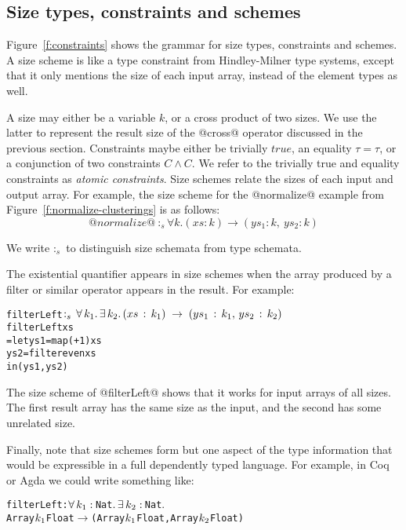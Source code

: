\newcommand{\constr}[1]{\llbracket #1 \rrbracket}


\subsection{Size types, constraints and schemes}
\label{s:SizeTypes}
Figure~\ref{f:constraints} shows the grammar for size types, constraints and schemes. A size scheme is like a type constraint from Hindley-Milner type systems, except that it only mentions the size of each input array, instead of the element types as well.

A size may either be a variable $k$, or a cross product of two sizes. We use the latter to represent the result size of the @cross@ operator discussed in the previous section. Constraints maybe either be trivially $true$, an equality $\tau = \tau$, or a conjunction of two constraints $C \wedge C$. We refer to the trivially true and equality constraints as \emph{atomic constraints}. Size schemes relate the sizes of each input and output array. For example, the size scheme for the @normalize@ example from Figure~\ref{f:normalize-clusterings} is as follows:
$$@normalize@ ~:_s \forall k. (xs : k) \to (ys_1 : k,~ ys_2 : k)
$$

We write $:_s$ to distinguish size schemata from type schemata.

The existential quantifier appears in size schemes when the array produced by a filter or similar operator appears in the result. For example:
\begin{alltt}
   filterLeft \(:\sb{s}\,\forall\,k\sb{1}.\,\exists\,k\sb{2}.\,(xs\,:\,k\sb{1})\;\to\;(ys\sb{1}\,:\,k\sb{1},\,ys\sb{2}\,:\,k\sb{2})\)
   filterLeft xs
     = let ys1 = map (+ 1)   xs
           ys2 = filter even xs
       in (ys1, ys2)
\end{alltt}

The size scheme of @filterLeft@ shows that it works for input arrays of all sizes. The first result array has the same size as the input, and the second has some unrelated size.

Finally, note that size schemes form but one aspect of the type information that would be expressible in a full dependently typed language. For example, in Coq or Agda we could write something like:
\begin{alltt}
filterLeft : \(\forall\,k\sb{1}:\,\)Nat\(.\,\exists\,k\sb{2}:\,\)Nat\(.\) 
  Array \(k\sb{1}\) Float \(\to\) (Array \(k\sb{1}\) Float, Array \(k\sb{2}\) Float)
\end{alltt}

